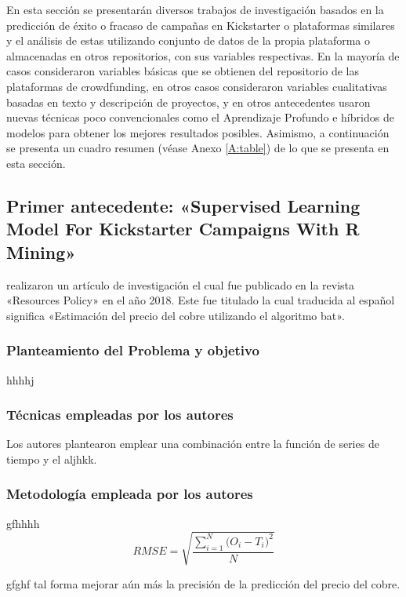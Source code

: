 En esta sección se presentarán diversos trabajos de investigación basados en la predicción de éxito o fracaso de campañas en Kickstarter o plataformas similares y el análisis de estas utilizando conjunto de datos de la propia plataforma o almacenadas en otros repositorios, con sus variables respectivas. En la mayoría de casos consideraron variables básicas que se obtienen del repositorio de las plataformas de crowdfunding, en otros casos consideraron variables cualitativas basadas en texto y descripción de proyectos, y en otros antecedentes usaron nuevas técnicas poco convencionales como el Aprendizaje Profundo e híbridos de modelos para obtener los mejores resultados posibles.
Asimismo, a continuación se presenta un cuadro resumen (véase Anexo \ref{A:table}) de lo que se presenta en esta sección.

\subsection{Primer antecedente: «Supervised Learning Model For Kickstarter Campaigns With R Mining» \citep*{pr_kamath2018suplearn}}
\citeauthor{pr_kamath2018suplearn} realizaron un artículo de investigación el cual fue publicado en la revista «Resources Policy» en el año 2018. Este fue titulado  la cual traducida al español significa «Estimación del precio del cobre utilizando el algoritmo bat».

\subsubsection{Planteamiento del Problema y objetivo }
hhhhj

\subsubsection{Técnicas empleadas por los autores}
Los autores plantearon emplear una combinación entre la función de series de tiempo y el aljhkk. 

\subsubsection{Metodología empleada por los autores}
gfhhhh
\begin{equation}  
\label{eq:RMSE}
RMSE = \sqrt{\frac{\sum_{i=1}^{N}{\Big(O_i -T_i\Big)^2}}{N}}
\end{equation}

gfghf tal forma mejorar aún más la precisión de la predicción del precio del cobre.

